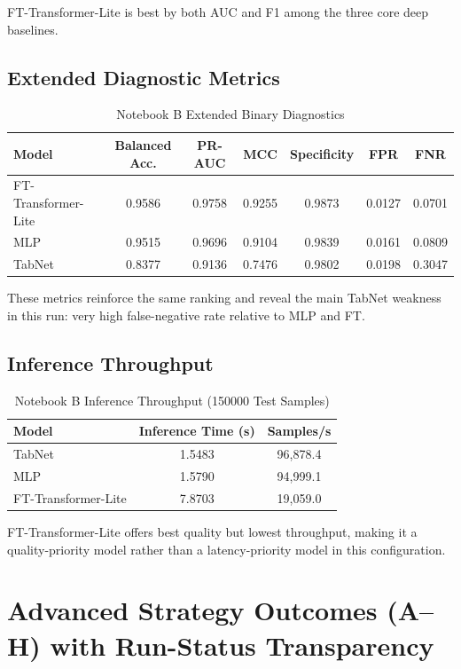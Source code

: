 \documentclass[10pt,journal]{IEEEtran}
\begin{document}
FT-Transformer-Lite is best by both AUC and F1 among the three core deep baselines.

\subsection{Extended Diagnostic Metrics}
\begin{table}[!t]
\caption{Notebook B Extended Binary Diagnostics}
\label{tab:dl_extended}
\centering
\begin{tabular}{lcccccc}
\toprule
Model & Balanced Acc. & PR-AUC & MCC & Specificity & FPR & FNR \\
\midrule
FT-Transformer-Lite & 0.9586 & 0.9758 & 0.9255 & 0.9873 & 0.0127 & 0.0701 \\
MLP & 0.9515 & 0.9696 & 0.9104 & 0.9839 & 0.0161 & 0.0809 \\
TabNet & 0.8377 & 0.9136 & 0.7476 & 0.9802 & 0.0198 & 0.3047 \\
\bottomrule
\end{tabular}
\end{table}

These metrics reinforce the same ranking and reveal the main TabNet weakness in this run: very high false-negative rate relative to MLP and FT.

\subsection{Inference Throughput}
\begin{table}[!t]
\caption{Notebook B Inference Throughput (\num{150000} Test Samples)}
\label{tab:dl_speed}
\centering
\begin{tabular}{lcc}
\toprule
Model & Inference Time (s) & Samples/s \\
\midrule
TabNet & 1.5483 & 96,878.4 \\
MLP & 1.5790 & 94,999.1 \\
FT-Transformer-Lite & 7.8703 & 19,059.0 \\
\bottomrule
\end{tabular}
\end{table}

FT-Transformer-Lite offers best quality but lowest throughput, making it a quality-priority model rather than a latency-priority model in this configuration.

\section{Advanced Strategy Outcomes (A--H) with Run-Status Transparency}
\end{document}
